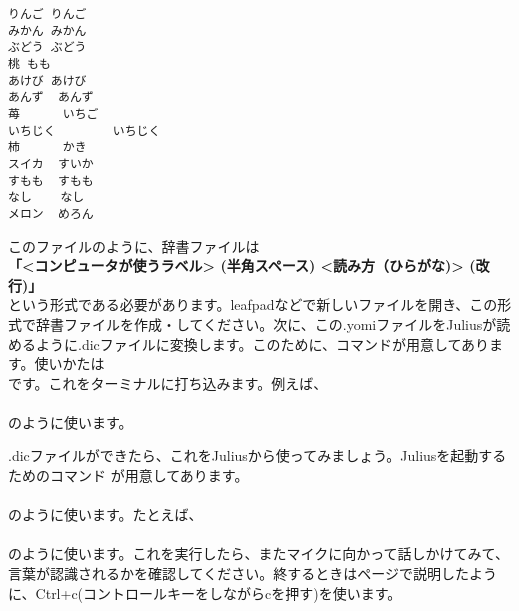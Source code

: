 \begin{lstlisting}[caption=kudamino.yomi,label=kudamino.yomi]
りんご りんご
みかん みかん
ぶどう ぶどう
桃 もも
あけび あけび
あんず  あんず
苺      いちご
いちじく        いちじく
柿      かき
スイカ  すいか
すもも  すもも
なし    なし
メロン  めろん
\end{lstlisting}

このファイルのように、辞書ファイルは\\
\textbf{「<コンピュータが使うラベル> (半角スペース) <読み方（ひらがな)> (改行)」}\\
という形式である必要があります。leafpadなどで新しいファイルを開き、この形式で辞書ファイルを作成・してください。次に、この.yomiファイルをJuliusが読めるように.dicファイルに変換します。このために、コマンドが用意してあります。使いかたは\\
です。これをターミナルに打ち込みます。例えば、\\
\\
のように使います。

.dicファイルができたら、これをJuliusから使ってみましょう。Juliusを起動するためのコマンド  が用意してあります。\\
\\
のように使います。たとえば、\\
\\
のように使います。これを実行したら、またマイクに向かって話しかけてみて、言葉が認識されるかを確認してください。終するときは\pageref{Julius}ページで説明したように、Ctrl+c(コントロールキーをしながらcを押す)を使います。

\begin{tcolorbox}[title=\useOmetoi]
\begin{enumerate}
\end{enumerate}
\end{tcolorbox}
